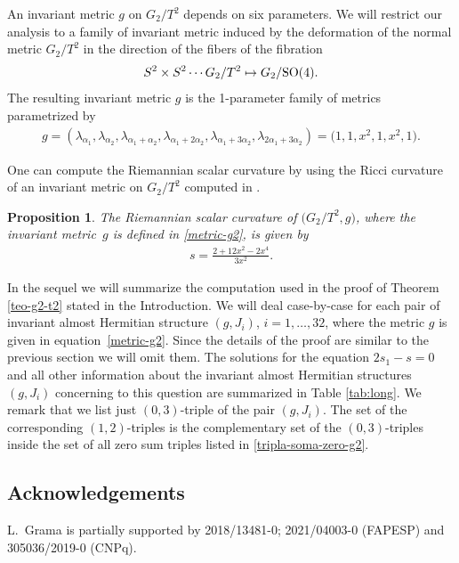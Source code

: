 \documentclass[10pt,a4paper]{amsart}
\numberwithin{equation}{section}
\newtheorem{Proposition}[Theorem]{Proposition}
 { \theoremstyle{definition}
\newtheorem{Definition}[Theorem]{Definition}
\newtheorem{Question}[Theorem]{Question}
\newtheorem*{Notation}{Notation}
\newtheorem{Example}[Theorem]{Example}
\newtheorem{Remark}[Theorem]{Remark} }
\begin{document}
An invariant metric $g$ on $G_2/T^2$ depends on six parameters. We will restrict our analysis to a family of invariant metric induced by the deformation of the normal metric $G_2/T^2$ in the direction of the fibers of the fibration
\begin{gather}
S^2\times S^2  \cdots G_2/T^2  \mapsto G_2/{\rm SO}(4).
\end{gather}
The resulting invariant metric $g$ is the 1-parameter family of metrics parametrized by
\begin{gather} \label{metric-g2}
g=(\lambda_{\alpha_{1}},\lambda_{\alpha_{2}},\lambda_{\alpha_{1}+\alpha_{2}}, \lambda_{\alpha_{1}+2\alpha_{2}},\lambda_{\alpha_{1}+3\alpha_{2}},\lambda_{2\alpha_{1}+3\alpha_{2}})= \big(1,1,x^{2},1,x^{2},1\big).
 \end{gather}

One can compute the Riemannian scalar curvature by using the Ricci curvature of an invariant metric on $G_2/T^2$ computed in \cite{AC-g2}.
\begin{Proposition}
The Riemannian scalar curvature of $\big(G_2/T^2,g\big)$, where the invariant metric~$g$ is defined in \eqref{metric-g2}, is given by
\begin{gather*}
s= \frac{2+12x^2-2x^4}{3x^2}.
\end{gather*}
\end{Proposition}

In the sequel we will summarize the computation used in the proof of Theorem \ref{teo-g2-t2} stated in the Introduction. We will deal case-by-case for each pair of invariant almost Hermitian structure $(g,J_i)$, $i=1,\ldots, 32$, where the metric $g$ is given in equation~\eqref{metric-g2}. Since the details of the proof are similar to the previous section we will omit them. The solutions for the equation $2s_1-s=0$ and all other information about the invariant almost Hermitian structures $(g,J_i)$ concerning to this question are summarized in Table \ref{tab:long}. We remark that we list just $(0,3)$-triple of the pair $(g,J_i)$. The set of the corresponding $(1,2)$-triples is the complementary set of the $(0,3)$-triples inside the set of all zero sum triples listed in \eqref{tripla-soma-zero-g2}.

\subsection*{Acknowledgements}
L.~Grama is partially supported by 2018/13481-0; 2021/04003-0 (FAPESP) and 305036/2019-0 (CNPq).
\end{document}
